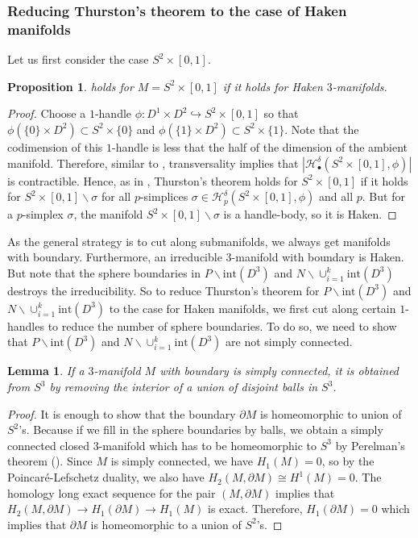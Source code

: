 \documentclass[a4paper]{amsart}
\newtheorem{prop}[thm]{Proposition}
\newtheorem{lem}[thm]{Lemma}
\theoremstyle{definition}
\theoremstyle{remark}
\numberwithin{equation}{section}
\begin{document}
\subsubsection{Reducing Thurston's theorem to the case of Haken manifolds} Let us first consider the case $S^2\times [0,1]$. 
\begin{prop}
 holds for $M=S^2\times [0,1]$ if it holds for Haken $3$-manifolds.
\end{prop}
\begin{proof}
Choose a $1$-handle $\phi:D^1\times D^2\hookrightarrow S^2\times [0,1]$ so that $\phi(\{0\}\times D^2)\subset S^2\times \{0\}$ and $\phi(\{1\}\times D^2)\subset S^2\times \{1\}$. Note that the codimension of this $1$-handle is less that the half of the dimension of the ambient manifold. Therefore, similar to , transversality implies that $|\mathcal{H}^{\delta}_{\bullet}(S^2\times [0,1], \phi)|$ is contractible. Hence, as in , Thurston's theorem holds for $S^2\times [0,1]$ if it holds for $S^2\times [0,1]\backslash \sigma$ for all $p$-simplices $\sigma\in \mathcal{H}^{\delta}_{p}(S^2\times [0,1], \phi)$ and all $p$. But for a $p$-simplex $\sigma$, the manifold $S^2\times [0,1]\backslash \sigma$ is a handle-body, so it is Haken. 
\end{proof}
As the general strategy is to cut along submanifolds, we always get manifolds with boundary. Furthermore, an irreducible $3$-manifold with boundary is Haken. But note that the sphere boundaries in $P\backslash \text{int}(D^3)$  and $N\backslash \cup_{i=1}^{k}\text{int}(D^3)$ destroys the irreducibility. So to reduce Thurston's theorem for $P\backslash \text{int}(D^3)$  and $N\backslash \cup_{i=1}^{k}\text{int}(D^3)$ to the case for Haken manifolds, we first cut along certain $1$-handles to reduce the number of sphere boundaries. To do so, we need to show that $P\backslash \text{int}(D^3)$  and $N\backslash \cup_{i=1}^{k}\text{int}(D^3)$  are not simply connected.
\begin{lem}\label{poincare}
If a $3$-manifold $M$ with boundary is simply connected, it is obtained from $S^3$ by removing the interior of a union of disjoint  balls in $S^3$. 
\end{lem}
\begin{proof}
It is enough to show that the boundary $\partial M$ is homeomorphic to union of $S^2$'s. Because if we fill in the sphere boundaries by balls, we obtain a simply connected closed $3$-manifold which has to be homeomorphic to $S^3$ by Perelman's theorem (\cite{perelman2002entropy, perelman2003ricci}). Since $M$ is simply connected, we have $H_1(M)=0$, so by the Poincar\' e-Lefschetz duality, we also have $H_2(M,\partial M)\cong H^1(M)=0$. The homology long exact sequence for the pair $(M, \partial M)$ implies that $H_2(M,\partial M)\to H_1(\partial M)\to H_1(M)$ is exact. Therefore, $H_1(\partial M)=0$ which implies that $\partial M$ is homeomorphic to a union of $S^2$'s.
\end{proof}
\end{document}
